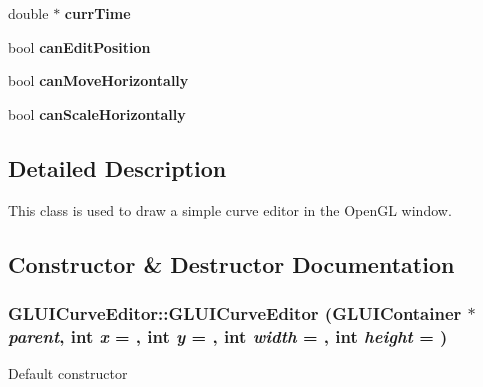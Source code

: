 \begin{DoxyCompactItemize}
\item 
\hypertarget{classCartWheel_1_1GL_1_1GLUICurveEditor_aff94427f8d168e96a4d4e1e78c49309c}{
double $\ast$ {\bfseries currTime}}
\label{classCartWheel_1_1GL_1_1GLUICurveEditor_aff94427f8d168e96a4d4e1e78c49309c}

\item 
\hypertarget{classCartWheel_1_1GL_1_1GLUICurveEditor_a8f526c0c296bf74c680068b582c6765f}{
bool {\bfseries canEditPosition}}
\label{classCartWheel_1_1GL_1_1GLUICurveEditor_a8f526c0c296bf74c680068b582c6765f}

\item 
\hypertarget{classCartWheel_1_1GL_1_1GLUICurveEditor_a1c26b90e463c92af3d835032e46164a9}{
bool {\bfseries canMoveHorizontally}}
\label{classCartWheel_1_1GL_1_1GLUICurveEditor_a1c26b90e463c92af3d835032e46164a9}

\item 
\hypertarget{classCartWheel_1_1GL_1_1GLUICurveEditor_a795a072a99793f400ec295a06ddeb002}{
bool {\bfseries canScaleHorizontally}}
\label{classCartWheel_1_1GL_1_1GLUICurveEditor_a795a072a99793f400ec295a06ddeb002}

\end{DoxyCompactItemize}


\subsection{Detailed Description}
This class is used to draw a simple curve editor in the OpenGL window. 

\subsection{Constructor \& Destructor Documentation}
\hypertarget{classCartWheel_1_1GL_1_1GLUICurveEditor_aef6b132ecca4afe48d166193738d84a8}{
\subsubsection[{GLUICurveEditor}]{\setlength{\rightskip}{0pt plus 5cm}GLUICurveEditor::GLUICurveEditor ({\bf GLUIContainer} $\ast$ {\em parent}, \/  int {\em x} = {}, \/  int {\em y} = {}, \/  int {\em width} = {}, \/  int {\em height} = {})}}
\label{classCartWheel_1_1GL_1_1GLUICurveEditor_aef6b132ecca4afe48d166193738d84a8}
Default constructor 

